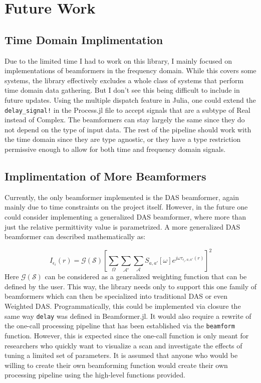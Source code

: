 \setcounter{chapter}{5}
\setcounter{section}{0}
\setcounter{subsection}{0}
\chapter*{Future Work}
\section{Time Domain Implimentation}
Due to the limited time I had to work on this library, I mainly focused on implementations of beamformers in the
frequency domain. While this covers some systems, the library effectively excludes a whole class of systems that perform
time domain data gathering. But I don't see this being difficult to include in future updates. Using the multiple
dispatch feature in Julia, one could extend the \lstinline[language=Julia]{delay_signal!} in the Process.jl file to
accept signals that are a subtype of Real instead of Complex. The beamformers can stay largely the same since they do
not depend on the type of input data. The rest of the pipeline should work with the time domain since they are type
agnostic, or they have a type restriction permissive enough to allow for both time and frequency domain signals.

\section{Implimentation of More Beamformers}
Currently, the only beamformer implemented is the DAS beamformer, again mainly due to time constraints on the project
itself. However, in the future one could consider implementing a generalized DAS beamformer, where more than just the
relative permittivity value is parametrized. A more generalized DAS beamformer can described mathematically as:

\begingroup
\large
\begin{equation}
    I_{\epsilon_i}(r) = \mathcal{G}(\mathcal{S}) \left [\sum_{\Omega}\sum_{\mathcal{A}'}\sum_{\mathcal{A}} S_{a, a'}[\omega]e^{j\omega \tau_{\epsilon_i, a, a'}(r)}\right ]^2
    \label{eq:GeneralisedDASBeamformer}
\end{equation}
\endgroup
Here $\mathcal{G}(\mathcal{S})$ can be considered as a generalized weighting function that can be defined by the user. This way, the
library needs only to support this one family of beamformers which can then be specialized into traditional DAS or even
Weighted DAS. Programmatically, this could be implemented via closure the same way \lstinline[language=Julia]{delay} was
defined in Beamformer.jl. It would also require a rewrite of the one-call processing pipeline that has been established
via the \lstinline[language=Julia]{beamform} function. However, this is expected since the one-call function is only
meant for researchers who quickly want to visualize a scan and investigate the effects of tuning a limited set of
parameters. It is assumed that anyone who would be willing to create their own beamforming function would create their
own processing pipeline using the high-level functions provided. 

